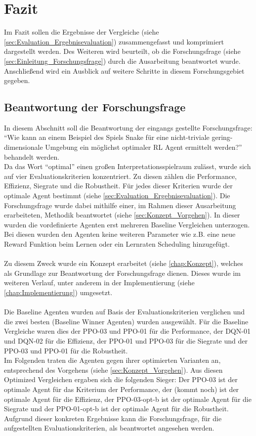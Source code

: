\chapter{Fazit}
Im Fazit sollen die Ergebnisse der Vergleiche (siehe \ref{sec:Evaluation_Ergebnisevaluation}) zusammengefasst und komprimiert dargestellt werden. Des Weiteren wird beurteilt, ob die Forschungsfrage (siehe \ref{sec:Einleitung_Forschungsfrage}) durch die Ausarbeitung beantwortet wurde.
Anschließend wird ein Ausblick auf weitere Schritte in diesem Forschungsgebiet gegeben.

\section{Beantwortung der Forschungsfrage}
In diesem Abschnitt soll die Beantwortung der eingangs gestellte Forschungsfrage:\\
"`Wie kann an einem Beispiel des Spiels Snake für eine nicht-triviale gering-dimensionale Umgebung ein möglichst optimaler RL Agent ermittelt werden?"' behandelt werden.\\
Da das Wort "`optimal"' einen großen Interpretationsspielraum zulässt, wurde sich auf vier Evaluationskriterien konzentriert. Zu diesen zählen die Performance, Effizienz, Siegrate und die Robustheit. Für jedes dieser Kriterien wurde der optimale Agent bestimmt (siehe \ref{sec:Evaluation_Ergebnisevaluation}).
Die Forschungsfrage wurde dabei mithilfe einer, im Rahmen dieser Ausarbeitung erarbeiteten, Methodik beantwortet (siehe \ref{sec:Konzept_Vorgehen}).
In dieser wurden die vordefinierte Agenten erst mehreren Baseline Vergleichen unterzogen. Bei diesen wurden den Agenten keine weiteren Parameter wie z.B. eine neue Reward Funktion beim Lernen oder ein Lernraten Scheduling hinzugefügt.\\
\\Zu diesem Zweck wurde ein Konzept erarbeitet (siehe \ref{chap:Konzept}), welches als Grundlage zur Beantwortung der Forschungsfrage dienen. Dieses wurde im weiteren Verlauf, unter anderem in der Implementierung (siehe \ref{chap:Implementierung}) umgesetzt.\\
\\Die Baseline Agenten wurden auf Basis der Evaluationskriterien verglichen und die zwei besten (Baseline Winner Agenten) wurden ausgewählt. Für die Baseline Vergleiche waren dies der PPO-03 und PPO-01 für die Performance, der DQN-01 und DQN-02 für die Effizienz, der PPO-01 und PPO-03 für die Siegrate und der PPO-03 und PPO-01 für die Robustheit.\\
Im Folgenden traten die Agenten gegen ihrer optimierten Varianten an, entsprechend des Vorgehens (siehe \ref{sec:Konzept_Vorgehen}).
Aus diesen Optimized Vergleichen ergaben sich die folgenden Sieger: Der PPO-03 ist der optimale Agent für das Kriterium der Performance, der (kommt noch) ist der optimale Agent für die Effizienz, der PPO-03-opt-b ist der optimale Agent für die Siegrate und der PPO-01-opt-b ist der optimale Agent für die Robustheit.\\
Aufgrund dieser konkreten Ergebnisse kann die Forschungsfrage, für die aufgestellten Evaluationskriterien, als beantwortet angesehen werden.

